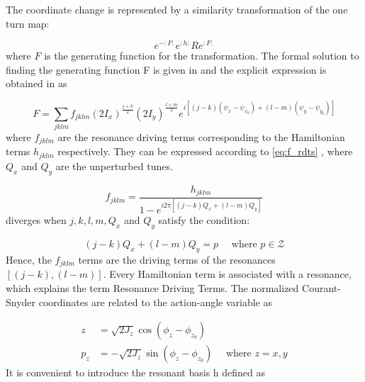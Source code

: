 The coordinate change is represented by a similarity transformation of the one turn map:

\begin{equation}
    e^{-: F:} e^{: h:} R e^{: F:}
\end{equation}
where \(F\) is the generating function for the transformation.
The formal solution to finding the generating function F is given in \cite{Forest_normal_forms} and the explicit expression is obtained in \cite{Tomas_thesis} as

\begin{equation}
    F = \sum_{j k l m} f_{j k l m} \left(2 I_{x}\right)^{\frac{j+k}{2}}\left(2 I_{y}\right)^{\frac{l+m}{2}} e^{i\left[(j-k)\left(\psi_{x}-\psi_{x_{0}}\right)+(l-m)\left(\psi_{y}-\psi_{y_{0}}\right)\right]}
    \label{eq:F_generating}
\end{equation}
where \(f_{jklm}\) are the resonance driving terms corresponding to the Hamiltonian terms \(h_{jklm}\) respectively.
They can be expressed according to \cref{eq:f_rdts} \cite{Tomas_thesis, Franchi_thesis}, where \(Q_x\) and \(Q_y\) are the unperturbed tunes.

\begin{equation}
    f_{jklm} = \frac{h_{jklm}}{1 - e^{i 2 \pi \left[(j-k) Q_{x} + (l-m) Q_{y} \right]}}
    \label{eq:f_rdts}
\end{equation}
 diverges when \(j, k, l, m, Q_x\) and \(Q_y\) satisfy the condition:

\begin{equation}
    (j-k) Q_{x} + (l-m) Q_{y} = p \quad \text{ where } p \in \mathcal{Z}
    \label{eq:resonance_condition}
\end{equation}
Hence, the \(f_{jklm}\) terms are the driving terms of the resonances \([(j-k),(l-m)]\).
Every Hamiltonian term is associated with a resonance, which explains the term Resonance Driving Terms.
The normalized Courant-Snyder coordinates are related to the action-angle variable as

\begin{equation}
    \begin{aligned}
    z &= \sqrt{2 J_{z}} \cos (\phi_{z} - \phi_{z_{0}}) \\
    p_{z} &= -\sqrt{2 J_{z}} \sin (\phi_{z} - \phi_{z_{0}}) \quad \text { where } z=x, y
    \end{aligned}
    \label{eq:courant_snyder_to_action_angle}
\end{equation}
It is convenient to introduce the resonant basis h defined as

